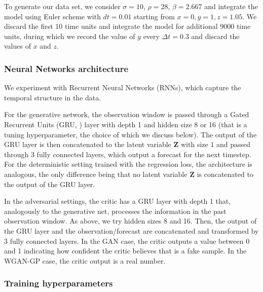 \documentclass[twoside,11pt]{article}
\begin{document}
	To generate our data set, we consider $ \sigma=10 $, $ \rho=28 $, $ \beta=2.667 $ and integrate the model using Euler scheme with $ dt = 0.01 $ starting from $ x=0, y=1, {z}=1.05 $. We discard the first 10 time units and integrate the model for additional 9000 time units, during which we record the value of $ y $ every $ \Delta t = 0.3 $ and discard the values of $ x $ and $ z $. 
	
	
	\subsubsection{Neural Networks architecture}\label{app:Lorenz63_nets}
	
	We experiment with Recurrent Neural Networks (RNNs), which capture the temporal structure in the data.
	
	For the generative network, the observation window is passed through a Gated Recurrent Units (GRU, \citealp{cho2014properties}) layer with depth 1 and hidden size 8 or 16 (that is a tuning hyperparameter, the choice of which we discuss below). The output of the GRU layer is then concatenated to the latent variable $ \mathbf{Z} $ with size $ 1 $ and passed through 3 fully connected layers, which output a forecast for the next timestep. For the deterministic setting trained with the regression loss, the architecture is analogous, the only difference being that no latent variable $ \mathbf Z $ is concatenated to the output of the GRU layer.
	
	In the adversarial settings, the critic has a GRU layer with depth 1 that, analogously to the generative net, processes the information in the past observation window. As above, we try hidden sizes 8 and 16. Then, the output of the GRU layer and the observation/forecast are concatenated and transformed by 3 fully connected layers. In the GAN case, the critic outputs a value between 0 and 1 indicating how confident the critic believes that is a fake sample. In the WGAN-GP case, the critic output is a real number.
	
	
	
	
	
	\subsubsection{Training hyperparameters}\label{app:Lorenz63_hyperparameters}
	
\end{document}
